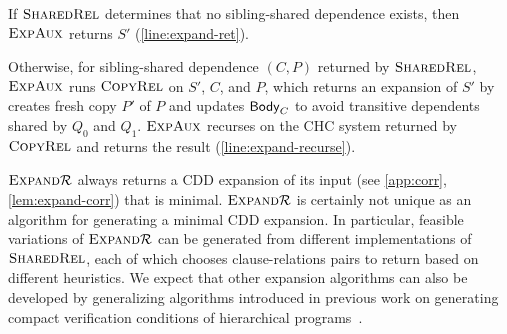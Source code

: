 If $\textsc{SharedRel}$ determines that no sibling-shared dependence
exists, then $\textsc{ExpAux}$ returns $S'$
(\autoref{line:expand-ret}).

Otherwise, for sibling-shared dependence $(C, P)$ returned
by $\textsc{SharedRel}$, $\textsc{ExpAux}$ runs $\textsc{CopyRel} $ on
$S'$, $C$, and $P$, which returns an expansion of
$S'$ by creates fresh copy $P'$ of $P$ and updates $\mathsf{Body}_{C}$ 
to avoid transitive dependents shared by $Q_0$ and $Q_1$.
%
$\textsc{ExpAux}$ recurses on the CHC system returned by $\textsc{CopyRel} $ and returns the result
(\autoref{line:expand-recurse}).
%  

$\textsc{Expand}{\mathcal{R}}$ always returns a CDD expansion of its input
(see \autoref{app:corr}, \autoref{lem:expand-corr}) that is minimal.
$\textsc{Expand}{ \mathcal{R} }$ is certainly not unique as an algorithm for
generating a minimal CDD expansion.
%
In particular, feasible variations of $\textsc{Expand}{ \mathcal{R} }$ can be
generated from different implementations of $\textsc{SharedRel}$, each of
which chooses clause-relations pairs to return based on different
heuristics.
%
We expect that other expansion algorithms can also be developed by
generalizing algorithms introduced in previous work on generating
compact verification conditions of hierarchical
programs~\cite{lal-qadeer15}.

